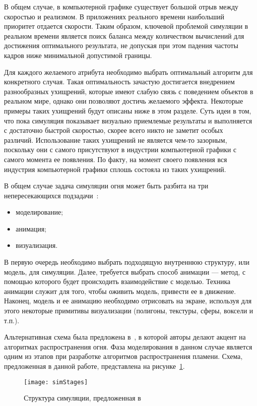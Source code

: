 В общем случае, в компьютерной графике существует большой отрыв между скоростью
и реализмом. В приложениях реального времени наибольший приоритет отдается
скорости. Таким образом, ключевой проблемой симуляции в реальном времени
является поиск баланса между количеством вычислений для достижения оптимального
результата, не допуская при этом падения частоты кадров ниже минимальной
допустимой границы.

Для каждого желаемого атрибута необходимо выбрать оптимальный алгоритм для
конкретного случая. Такая оптимальность зачастую достигается внедрением
разнообразных ухищрений, которые имеют слабую связь с поведением объектов в
реальном мире, однако они позволяют достичь желаемого эффекта. Некоторые примеры
таких ухищрений будут описаны ниже в этом разделе. Суть идеи в том, что пока
симуляция показывает визуально приемлемые результаты и выполняется с достаточно
быстрой скоростью, скорее всего никто не заметит особых различий. Использование
таких ухищрений не является чем-то зазорным, поскольку они с самого присутствуют
в индустрии компьютерной графики с самого момента ее появления. По факту, на
момент своего появления вся индустрия компьютерной графики сплошь состояла из
таких ухищрений.

В общем случае задача симуляции огня может быть разбита на три
непересекающихся подзадачи~\cite{Perry94synthesizingflames}:
\begin{itemize}
	\item моделирование;
	\item анимация;
	\item визуализация.
\end{itemize}

В первую очередь необходимо выбрать подходящую внутреннюю структуру, или модель,
для симуляции. Далее, требуется выбрать способ анимации --- метод, с помощью
которого будет происходить взаимодействие с моделью. Техника анимации служит для
того, чтобы оживить модель, привести ее в движение. Наконец, модель и ее
анимацию необходимо отрисовать на экране, используя для этого некоторые
примитивы визуализации (полигоны, текстуры, сферы, воксели и т.п.).

Альтернативная схема была предложена в~\cite{realistic_sim}, в которой авторы
делают акцент на алгоритмах распространения огня. Фаза моделирования в данном
случае является одним из этапов при разработке алгоритмов распространения
пламени. Схема, предложенная в данной работе, представлена на
рисунке~\ref{fig:simStages}.

\begin{figure}[htb]
	\centering
    \texttt{[image: simStages]}
    \caption{Структура симуляции, предложенная в~\cite{realistic_sim}}%
    \label{fig:simStages}
\end{figure}


